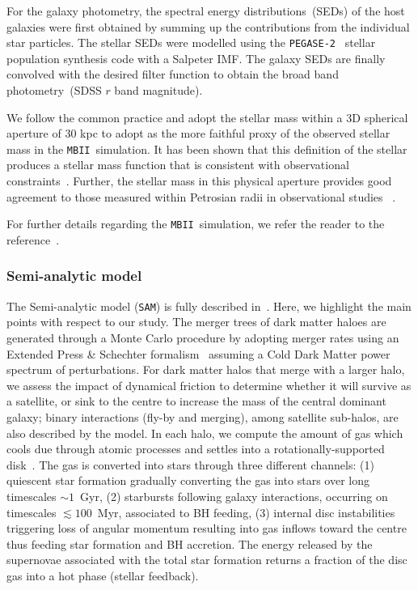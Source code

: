 \documentclass[twocolumn,trackchanges]{aastex63}
\newcommand{\sam}{\texttt{SAM}}
\newcommand{\mbii}{\texttt{MBII}}
\begin{document}
For the galaxy photometry, the spectral energy distributions~(SEDs) of the host galaxies were first obtained by summing up the contributions from the individual star particles. The stellar SEDs were modelled using the \texttt{PEGASE-2}~\citep{1999astro.ph.12179F} stellar population synthesis code with a Salpeter IMF. The galaxy SEDs are finally convolved with the desired filter function to obtain the broad band photometry~(SDSS $r$ band magnitude). 

We follow the common practice and adopt the stellar mass within a 3D spherical aperture of 30 kpc to adopt as the more faithful proxy of the observed stellar mass in the \mbii\ simulation. It has been shown that this definition of the stellar produces a stellar mass function that is consistent with observational constraints~\citep{Pillepich2018}. Further, the stellar mass in this physical aperture provides good agreement to those measured within Petrosian radii in observational studies ~\citep{Schaye2015}.


For further details regarding the \mbii\ simulation, we refer the reader to the reference~\citep{2015MNRAS.450.1349K}.

\subsubsection{Semi-analytic model}
\label{sec_intro_SAM}
The Semi-analytic model (\sam) is fully described in~\citet{Menci2016}. Here, we highlight the main points with respect to our study. The merger trees of dark matter haloes are generated through a Monte Carlo procedure by adopting merger rates using an Extended Press \& Schechter formalism~\citep{Lacey1993} assuming a Cold Dark Matter power spectrum of perturbations. For dark matter halos  that merge with a larger halo, we assess the impact of dynamical friction to determine whether it will survive as a satellite, or sink to the centre to increase the mass of the central dominant galaxy; binary interactions (fly-by and merging), among satellite sub-halos, are also described by the model. In each halo, we compute the amount of gas which cools due through atomic processes and settles into a rotationally-supported disk~\citep{Mo1998}. The gas is converted into stars through three different channels: (1) quiescent star formation gradually converting the gas into stars over long timescales $\sim 1$~Gyr, (2) starbursts following galaxy interactions, occurring on timescales $\lesssim 100$~Myr, associated to BH feeding, (3) internal disc instabilities triggering loss of angular momentum resulting into gas inflows toward the centre thus feeding star formation and BH accretion. The energy released by the supernovae associated with the total star formation returns a fraction of the disc gas into a hot phase (stellar feedback). 
\end{document}

